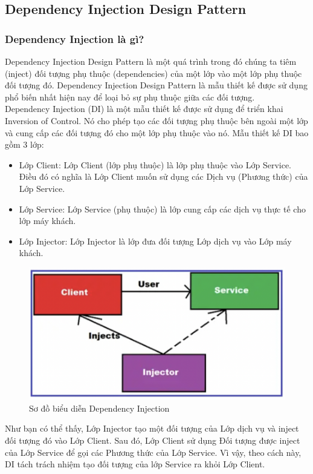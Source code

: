 \subsection{Dependency Injection Design Pattern} 
\subsubsection{Dependency Injection là gì?}
\hspace*{0.5cm} Dependency Injection Design Pattern là một quá trình trong đó chúng ta tiêm (inject) đối tượng phụ thuộc (dependencies) của một lớp vào một lớp phụ thuộc đối tượng đó. Dependency Injection Design Pattern là mẫu thiết kế được sử dụng phổ biến nhất hiện nay để loại bỏ sự phụ thuộc giữa các đối tượng.\\
\hspace*{0.5cm} Dependency Injection (DI) là một mẫu thiết kế được sử dụng để triển khai Inversion of Control. Nó cho phép tạo các đối tượng phụ thuộc bên ngoài một lớp và cung cấp các đối tượng đó cho một lớp phụ thuộc vào nó. Mẫu thiết kế DI bao gồm 3 lớp:
\begin{itemize}
	\item Lớp Client: Lớp Client (lớp phụ thuộc) là lớp phụ thuộc vào Lớp Service. Điều đó có nghĩa là Lớp Client muốn sử dụng các Dịch vụ (Phương thức) của Lớp Service.
	\item Lớp Service: Lớp Service (phụ thuộc) là lớp cung cấp các dịch vụ thực tế cho lớp máy khách.
	\item Lớp Injector: Lớp Injector là lớp đưa đối tượng Lớp dịch vụ vào Lớp máy khách.
\end{itemize}
\begin{figure}[H]
	\centering
	\includegraphics[width=\textwidth]{Images/DI_diagram.png}
	\vspace{0.25cm}
	\caption{Sơ đồ biểu diễn Dependency Injection}
\end{figure}
\hspace*{0.5cm} Như bạn có thể thấy, Lớp Injector tạo một đối tượng của Lớp dịch vụ và inject đối tượng đó vào Lớp Client. Sau đó, Lớp Client sử dụng Đối tượng được inject của Lớp Service để gọi các Phương thức của Lớp Service. Vì vậy, theo cách này, DI tách trách nhiệm tạo đối tượng của lớp Service ra khỏi Lớp Client. 
